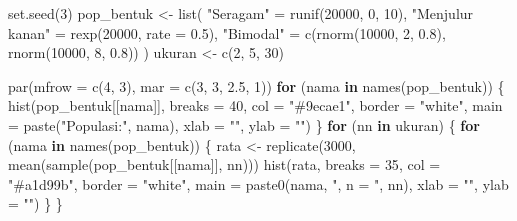 \documentclass[
  indonesian,
  letterpaper,
]{book}
\newenvironment{Shaded}{\begin{snugshade}}{\end{snugshade}}
\newcommand{\AttributeTok}[1]{\textcolor[rgb]{0.40,0.45,0.13}{#1}}
\newcommand{\ControlFlowTok}[1]{\textcolor[rgb]{0.00,0.23,0.31}{\textbf{#1}}}
\newcommand{\DecValTok}[1]{\textcolor[rgb]{0.68,0.00,0.00}{#1}}
\newcommand{\FloatTok}[1]{\textcolor[rgb]{0.68,0.00,0.00}{#1}}
\newcommand{\FunctionTok}[1]{\textcolor[rgb]{0.28,0.35,0.67}{#1}}
\newcommand{\NormalTok}[1]{\textcolor[rgb]{0.00,0.23,0.31}{#1}}
\newcommand{\OtherTok}[1]{\textcolor[rgb]{0.00,0.23,0.31}{#1}}
\newcommand{\StringTok}[1]{\textcolor[rgb]{0.13,0.47,0.30}{#1}}
\begin{document}
\begin{Shaded}
\begin{Highlighting}[]
\FunctionTok{set.seed}\NormalTok{(}\DecValTok{3}\NormalTok{)}
\NormalTok{pop\_bentuk }\OtherTok{\textless{}{-}} \FunctionTok{list}\NormalTok{(}
  \StringTok{"Seragam"}        \OtherTok{=} \FunctionTok{runif}\NormalTok{(}\DecValTok{20000}\NormalTok{, }\DecValTok{0}\NormalTok{, }\DecValTok{10}\NormalTok{),}
  \StringTok{"Menjulur kanan"} \OtherTok{=} \FunctionTok{rexp}\NormalTok{(}\DecValTok{20000}\NormalTok{, }\AttributeTok{rate =} \FloatTok{0.5}\NormalTok{),}
  \StringTok{"Bimodal"}        \OtherTok{=} \FunctionTok{c}\NormalTok{(}\FunctionTok{rnorm}\NormalTok{(}\DecValTok{10000}\NormalTok{, }\DecValTok{2}\NormalTok{, }\FloatTok{0.8}\NormalTok{), }\FunctionTok{rnorm}\NormalTok{(}\DecValTok{10000}\NormalTok{, }\DecValTok{8}\NormalTok{, }\FloatTok{0.8}\NormalTok{))}
\NormalTok{)}
\NormalTok{ukuran }\OtherTok{\textless{}{-}} \FunctionTok{c}\NormalTok{(}\DecValTok{2}\NormalTok{, }\DecValTok{5}\NormalTok{, }\DecValTok{30}\NormalTok{)}

\FunctionTok{par}\NormalTok{(}\AttributeTok{mfrow =} \FunctionTok{c}\NormalTok{(}\DecValTok{4}\NormalTok{, }\DecValTok{3}\NormalTok{), }\AttributeTok{mar =} \FunctionTok{c}\NormalTok{(}\DecValTok{3}\NormalTok{, }\DecValTok{3}\NormalTok{, }\FloatTok{2.5}\NormalTok{, }\DecValTok{1}\NormalTok{))}
\ControlFlowTok{for}\NormalTok{ (nama }\ControlFlowTok{in} \FunctionTok{names}\NormalTok{(pop\_bentuk)) \{}
  \FunctionTok{hist}\NormalTok{(pop\_bentuk[[nama]], }\AttributeTok{breaks =} \DecValTok{40}\NormalTok{, }\AttributeTok{col =} \StringTok{"\#9ecae1"}\NormalTok{, }\AttributeTok{border =} \StringTok{"white"}\NormalTok{,}
       \AttributeTok{main =} \FunctionTok{paste}\NormalTok{(}\StringTok{"Populasi:"}\NormalTok{, nama), }\AttributeTok{xlab =} \StringTok{""}\NormalTok{, }\AttributeTok{ylab =} \StringTok{""}\NormalTok{)}
\NormalTok{\}}
\ControlFlowTok{for}\NormalTok{ (nn }\ControlFlowTok{in}\NormalTok{ ukuran) \{}
  \ControlFlowTok{for}\NormalTok{ (nama }\ControlFlowTok{in} \FunctionTok{names}\NormalTok{(pop\_bentuk)) \{}
\NormalTok{    rata }\OtherTok{\textless{}{-}} \FunctionTok{replicate}\NormalTok{(}\DecValTok{3000}\NormalTok{, }\FunctionTok{mean}\NormalTok{(}\FunctionTok{sample}\NormalTok{(pop\_bentuk[[nama]], nn)))}
    \FunctionTok{hist}\NormalTok{(rata, }\AttributeTok{breaks =} \DecValTok{35}\NormalTok{, }\AttributeTok{col =} \StringTok{"\#a1d99b"}\NormalTok{, }\AttributeTok{border =} \StringTok{"white"}\NormalTok{,}
         \AttributeTok{main =} \FunctionTok{paste0}\NormalTok{(nama, }\StringTok{", n = "}\NormalTok{, nn), }\AttributeTok{xlab =} \StringTok{""}\NormalTok{, }\AttributeTok{ylab =} \StringTok{""}\NormalTok{)}
\NormalTok{  \}}
\NormalTok{\}}
\end{Highlighting}
\end{Shaded}
\end{document}
